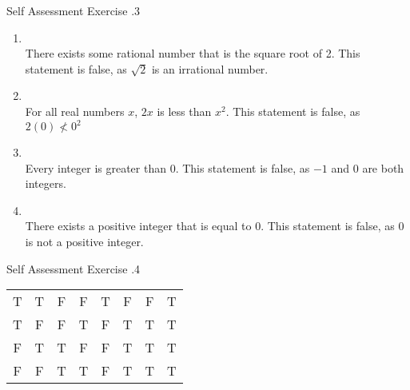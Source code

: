 \documentclass[\main/notes.tex]{subfiles}
\begin{document}
				\begin{exercise}{Self Assessment Exercise \thechapter.3}
					\begin{enumerate}[label=(\alph*)]
						\item {}\\
							There exists some rational number that is the square root of 2. This statement is false, as $\sqrt{2}$ is an irrational number.
						\item {}\\
							For all real numbers $x$, $2x$ is less than $x^{2}$. This statement is false, as $2(0) \not < 0^{2}$
						\item {}\\
							Every integer is greater than $0$. This statement is false, as $-1$ and $0$ are both integers.
						\item {}\\
							There exists a positive integer that is equal to $0$. This statement is false, as $0$ is not a positive integer.
					\end{enumerate}
				\end{exercise}
				\pagebreak
				\begin{exercise}{Self Assessment Exercise \thechapter.4}
					\begin{center}
						\begin{tabular}{| c c | c c | c | c | c | c|}
							\hline
							\tablehead{$p$} & \tablehead{$q$} & \tablehead{$\lnot p$} & \tablehead{$\lnot q$} & \tablehead{$p \land q$} & \tablehead{$\lnot (p \land q)$} & \tablehead{$(\lnot p) \lor (\lnot q)$} & \tablehead{$\lnot (p \land q) \leftrightarrow (\lnot p) \lor (\lnot q)$}\\
							\hline
							T & T & F & F & T & F & F & T\\
							T & F & F & T & F & T & T & T\\
							F & T & T & F & F & T & T & T\\
							F & F & T & T & F & T & T & T\\
							\hline
						\end{tabular}
					\end{center}
				\end{exercise}
\end{document}
